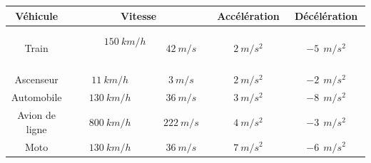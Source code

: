 \documentclass[11pt,a4paper]{article}
\newenvironment{itemize*}%
    {\begin{itemize}%
      \setlength{\itemsep}{0pt}%
      \setlength{\parskip}{0pt}}%
    {\end{itemize}}
\begin{document}
\begin{itemize*}
    \begin{tabular}{|c||c|c|c|c|}
         \hline
         \rowcolor{orange} Véhicule &  \multicolumn{2}{|c|}{Vitesse} & Accélération & Décélération\\
         \hline 
        Train & ~~~~~~$150~ km/h$~~~~~~~~ & ~~~~~~~~ $42~ m/s$ ~~~~~~~~ & ~~~~~~~~ $2 ~m/s^2$ ~~~~~~~~ & ~~~~~~~~ $-5~~m/s^2$~~~~~~~~ \\
        \hline
         Ascenseur& $11~ km/h$ & $3~ m/s$ & $2 ~m/s^2$ & $-2~~m/s^2$\\
         \hline
         Automobile & $130~ km/h$ & $36~ m/s$ & $3 ~m/s^2$ & $-8~~m/s^2$\\
         \hline
         Avion de ligne & $800~ km/h$ & $222~ m/s$ & $4 ~m/s^2$ & $-3~~m/s^2$\\
         \hline
         Moto & $130~ km/h$ & $36~ m/s$ & $7 ~m/s^2$ & $-6~~m/s^2$\\
         \hline 
    \end{tabular}





\vfill 
\end{itemize*}
\end{document}
